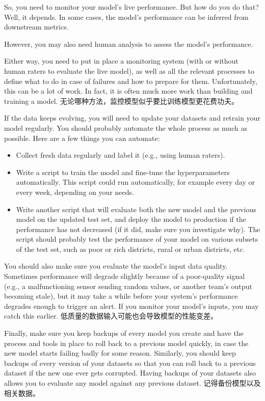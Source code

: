 So, you need to monitor your model's live performance. But how do you do that? Well, it depends. In some cases, the model's performance can be inferred from downstream metrics. 

However, you may also need human analysis to assess the model's performance.

Either way, you need to put in place a monitoring system (with or without human raters to evaluate the live model), as well as all the relevant processes to define what to do in case of failures and how to prepare for them. Unfortunately, this can be a lot of work. In fact, it is often much more work than building and training a model. 无论哪种方法，监控模型似乎要比训练模型更花费功夫。

If the data keeps evolving, you will need to update your datasets and retrain your model regularly. You should probably automate the whole process as much as possible. Here are a few things you can automate:
\begin{itemize}
    \item Collect fresh data regularly and label it (e.g., using human raters).
    \item Write a script to train the model and fine-tune the hyperparameters automatically. This script could run automatically, for example every day or every week, depending on your needs.
    \item Write another script that will evaluate both the new model and the previous model on the updated test set, and deploy the model to production if the performance has not decreased (if it did, make sure you investigate why). The script should probably test the performance of your model on various subsets of the test set, such as poor or rich districts, rural or urban districts, etc.
\end{itemize}

You should also make sure you evaluate the model's input data quality. Sometimes performance will degrade slightly because of a poor-quality signal (e.g., a malfunctioning sensor sending random values, or another team's output becoming stale), but it may take a while before your system's performance degrades enough to trigger an alert. If you monitor your model's inputs, you may catch this earlier. 低质量的数据输入可能也会导致模型的性能变差。

Finally, make sure you keep backups of every model you create and have the process and tools in place to roll back to a previous model quickly, in case the new model starts failing badly for some reason. Similarly, you should keep backups of every version of your datasets so that you can roll back to a previous dataset if the new one ever gets corrupted. Having backups of your datasets also allows you to evaluate any model against any previous dataset. 记得备份模型以及相关数据。

